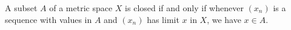 A subset $A$ of a metric space $X$ is closed if and only if whenever $(x_n)$ is a sequence with values in $A$ and $(x_n)$ has limit $x$ in $X$, we have $x \in A$.